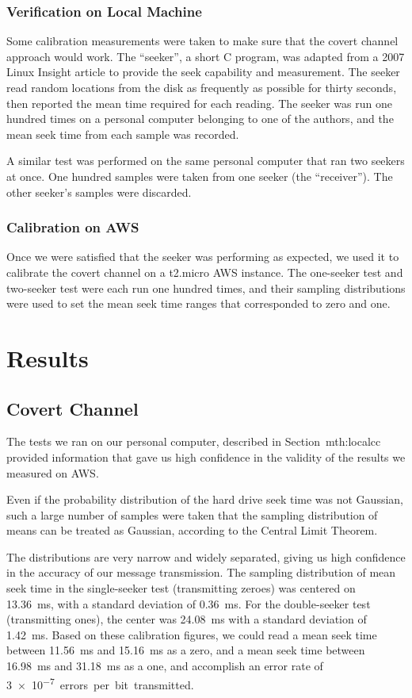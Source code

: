 \documentclass[conference]{IEEEtran}
\begin{document}
\subsubsection{Verification on Local Machine}
Some calibration measurements were taken to make sure that the covert channel approach would work.
The ``seeker'', a short C program, was adapted from a 2007 Linux Insight article \cite{seeker07} to provide the seek
  capability and measurement.
The seeker read random locations from the disk as frequently as possible for thirty seconds, then reported the mean
  time required for each reading.
The seeker was run one hundred times on a personal computer belonging to one of the authors, and the mean seek time
  from each sample was recorded.

A similar test was performed on the same personal computer that ran two seekers at once.
One hundred samples were taken from one seeker (the ``receiver'').
The other seeker's samples were discarded.

\subsubsection{Calibration on AWS}
Once we were satisfied that the seeker was performing as expected, we used it to calibrate the covert channel on a
  t2.micro AWS instance.
The one-seeker test and two-seeker test were each run one hundred times, and their sampling distributions were
  used to set the mean seek time ranges that corresponded to zero and one.

\section{Results}
\subsection{Covert Channel}
The tests we ran on our personal computer, described in Section~{mth:localcc} provided information that gave us high
  confidence in the validity of the results we measured on AWS.

Even if the probability distribution of the hard drive seek time was not Gaussian, such a large number of samples were
  taken that the sampling distribution of means can be treated as Gaussian, according to the Central Limit Theorem.

The distributions are very narrow and widely separated, giving us high confidence in the accuracy of our message
  transmission.
The sampling distribution of mean seek time in the single-seeker test (transmitting zeroes) was centered on
  \SI{13.36}{ms}, with a standard deviation of \SI{0.36}{ms}.
For the double-seeker test (transmitting ones), the center was \SI{24.08}{ms} with a standard deviation of
  \SI{1.42}{ms}.
Based on these calibration figures, we could read a mean seek time between \SI{11.56}{ms} and \SI{15.16}{ms}
  as a zero, and a mean seek time between \SI{16.98}{ms} and \SI{31.18}{ms} as a one, and accomplish an error rate of
  \SI{3e-7} errors per bit transmitted.
\end{document}
